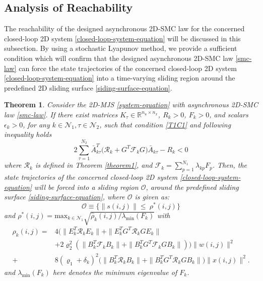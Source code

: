 \documentclass[journal,final,twocolumn]{IEEEtran}
\newtheorem{theorem}{Theorem}
\begin{document}
\subsection{Analysis of Reachability}\label{minimization} 
	 The reachability of the  designed asynchronous 2D-SMC law for the concerned closed-loop 2D system \eqref{closed-loop-system-equation} will be discussed in this subsection. By using a stochastic Lyapunov method, we provide a sufficient condition which will confirm that the designed asynchronous 2D-SMC law \eqref{smc-law} can force the state trajectories of the concerned closed-loop 2D system \eqref{closed-loop-system-equation} into a time-varying sliding region around the predefined 2D sliding surface \eqref{siding-surface-equation}.
	 

\begin{theorem}\label{theorem2}	
	Consider the 2D-MJS \eqref{system-equation} with asynchronous 2D-SMC law \eqref{smc-law}. If there exist matrices $K_{\tau }\in\mathbb{R}^{n_u\times n_x}$, $R_{k}>0$, $F_{k}>0$, and  scalars $\epsilon_{k}>0$, for any $k\in\mathcal{N}_{1}, \tau\in\mathcal{N}_{2}$, such that  condition \eqref{T1C1} and  following inequality holds
	\begin{equation} \label{T2C1}
		2\sum_{\tau =1}^{N_{2}} \bar{A}^{T}_{k\tau }\big(\mathcal{R}_{k}+G^{T}\mathcal{F}_{k}G\big)\bar{A}_{k\tau }-R_{k} <0
	\end{equation}
	where $\mathcal{R}_{k}$ is defined in Theorem \ref{theorem1}, and $\mathcal{F}_{k}=\sum_{p=1}^{N_{1}}\lambda_{kp}F_{p}$. Then, the state trajectories of the concerned closed-loop 2D system \eqref{closed-loop-system-equation} will be forced into a sliding region $\mathcal{O}$, around the predefined sliding surface \eqref{siding-surface-equation}, where  $\mathcal{O}$ is given as:
	\begin{equation}\label{smc-region}
		\mathcal{O}\equiv\Big\{\|s(i,j)\|\leq\ \rho^{*}(i,j) \Big\}
	\end{equation} 
	and $\rho^{*}(i,j) = \mathrm{max}_{k\in\mathcal{N}_{1}}\sqrt{\hat{\rho}_{k}(i,j)/
	\lambda_{\mathrm{min}}(F_{k})}$ with
	\begin{equation*}
		 \begin{split}
		 	\hat{\rho}_{k}(i,j)=&4\big(\|E^{T}_{k}\mathcal{R}_{k}E_{k}\|+ \|E^{T}_{k}G^{T}\mathcal{R}_{k}GE_{k}\|\\
		 	&+2\varrho_{2}^{2}(\|B^{T}_{k}\mathcal{F}_{k}B_{k}\|+ \|B^{T}_{k}G^{T}\mathcal{F}_{k}GB_{k}\| )\big)\|w(i,j)\|^{2}\\
		 	+&8(\varrho_{1}+\delta_{k})^{2}\big(\|B^{T}_{k}\mathcal{R}_{k}B_{k}\|+\|B^{T}_{k}G^{T}\mathcal{R}_{k}GB_{k}\|\big)\|x(i,j)\|^{2}.
		 \end{split}
	\end{equation*}
	and $\lambda_{\mathrm{min}}(F_{k})$ here denotes the minimum eigenvalue of $F_{k}$.
\end{theorem} 
\end{document}
